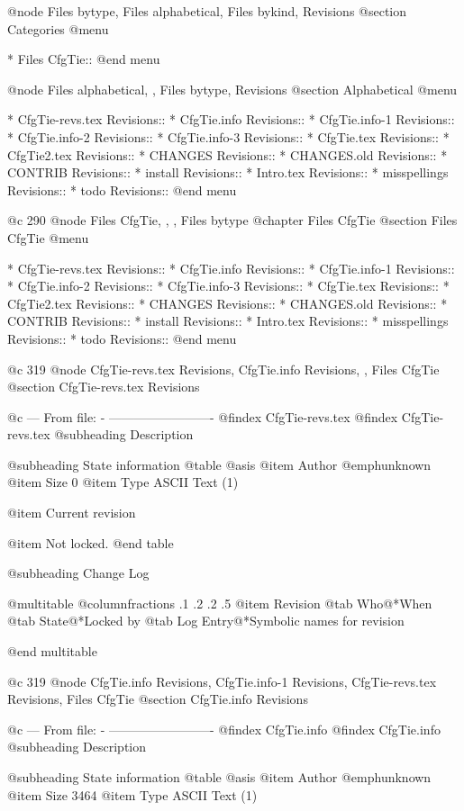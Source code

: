 
@node Files bytype, Files alphabetical, Files bykind, Revisions
@section Categories
@menu

* Files CfgTie::
@end menu


@node Files alphabetical, , Files bytype, Revisions
@section Alphabetical
@menu

* CfgTie-revs.tex Revisions::
* CfgTie.info Revisions::
* CfgTie.info-1 Revisions::
* CfgTie.info-2 Revisions::
* CfgTie.info-3 Revisions::
* CfgTie.tex Revisions::
* CfgTie2.tex Revisions::
* CHANGES Revisions::
* CHANGES.old Revisions::
* CONTRIB Revisions::
* install Revisions::
* Intro.tex Revisions::
* misspellings Revisions::
* todo Revisions::
@end menu


@c 290
@node Files CfgTie,  ,  , Files bytype
@chapter Files CfgTie
@section Files CfgTie 
@menu

* CfgTie-revs.tex Revisions::
* CfgTie.info Revisions::
* CfgTie.info-1 Revisions::
* CfgTie.info-2 Revisions::
* CfgTie.info-3 Revisions::
* CfgTie.tex Revisions::
* CfgTie2.tex Revisions::
* CHANGES Revisions::
* CHANGES.old Revisions::
* CONTRIB Revisions::
* install Revisions::
* Intro.tex Revisions::
* misspellings Revisions::
* todo Revisions::
@end menu

@c 319
@node CfgTie-revs.tex Revisions, CfgTie.info Revisions,  , Files CfgTie
@section CfgTie-revs.tex Revisions


@c --- From file: - -------------------------
@findex CfgTie-revs.tex
@findex CfgTie-revs.tex
@subheading Description


@subheading State information
@table @asis
@item Author
@emph{unknown}
@item Size
0
@item Type
ASCII Text (1)

@item Current revision

@item Not locked.
@end table

@subheading Change Log

@multitable @columnfractions .1 .2 .2 .5
@item Revision
@tab Who@*When
@tab State@*Locked by
@tab Log Entry@*Symbolic names for revision


@end multitable


@c 319
@node CfgTie.info Revisions, CfgTie.info-1 Revisions, CfgTie-revs.tex Revisions, Files CfgTie
@section CfgTie.info Revisions


@c --- From file: - -------------------------
@findex CfgTie.info
@findex CfgTie.info
@subheading Description


@subheading State information
@table @asis
@item Author
@emph{unknown}
@item Size
3464
@item Type
ASCII Text (1)

